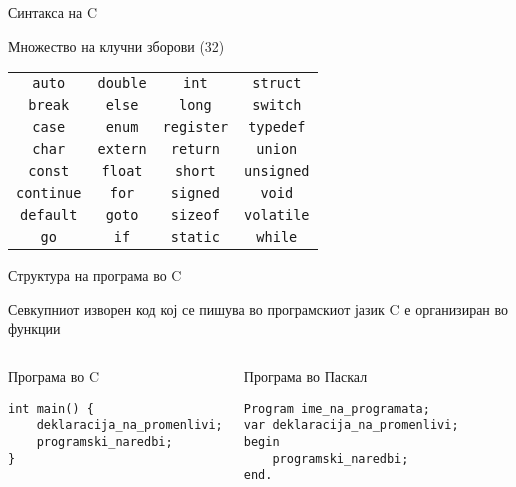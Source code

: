 \begin{frame}{Синтакса на C}

    \begin{block}{Множество на клучни зборови (32)}

    \begin{tabular}{c c c c}
        \texttt{auto} & \texttt{double} & \texttt{int} & \texttt{struct} \\
        \texttt{break} & \texttt{else} & \texttt{long} & \texttt{switch} \\
        \texttt{case} & \texttt{enum} & \texttt{register} & \texttt{typedef} \\
        \texttt{char} & \texttt{extern} & \texttt{return} & \texttt{union} \\
        \texttt{const} & \texttt{float} & \texttt{short} & \texttt{unsigned} \\
        \texttt{continue} & \texttt{for} & \texttt{signed} & \texttt{void} \\
        \texttt{default} & \texttt{goto} & \texttt{sizeof} & \texttt{volatile} \\
        \texttt{go} & \texttt{if} & \texttt{static} & \texttt{while}
    \end{tabular}
    \end{block}
\end{frame}

\begin{frame}[fragile]{Структура на програма во C}

    Севкупниот изворен код кој се пишува во програмскиот јазик C е организиран во функции
    \linebreak
    
    \begin{columns}[t]
            \begin{block}{Програма во C}
\begin{lstlisting}
int main() {
    deklaracija_na_promenlivi;
    programski_naredbi;
}
\end{lstlisting}
            \end{block}
            \begin{block}{Програма во Паскал}
\begin{lstlisting}
Program ime_na_programata;
var deklaracija_na_promenlivi;
begin
    programski_naredbi;
end.
\end{lstlisting}
            \end{block}
    \end{columns}

\end{frame}

